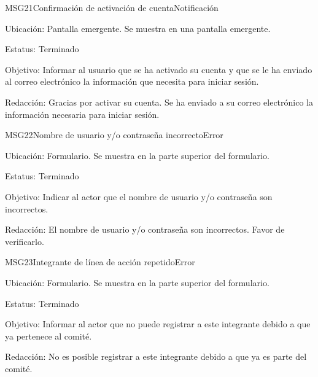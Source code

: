 \begin{mensaje}{MSG21}{Confirmación de activación de cuenta}{Notificación}
    \item[Ubicación:] Pantalla emergente. Se muestra en una pantalla emergente.
    \item[Estatus:] Terminado
    \item[Objetivo:] Informar al usuario que se ha activado su cuenta y que se le ha enviado al correo electrónico la información que necesita para iniciar sesión.
    \item[Redacción:] Gracias por activar su cuenta. Se ha enviado a su correo electrónico la información necesaria para iniciar sesión.
\end{mensaje}

\begin{mensaje}{MSG22}{Nombre de usuario y/o contraseña incorrecto}{Error}
    \item[Ubicación:] Formulario. Se muestra en la parte superior del formulario.
    \item[Estatus:] Terminado
    \item[Objetivo:] Indicar al actor que el nombre de usuario y/o contraseña son incorrectos.
    \item[Redacción:] El nombre de usuario y/o contraseña son incorrectos. Favor de verificarlo.
\end{mensaje}
\begin{mensaje}{MSG23}{Integrante de línea de acción repetido}{Error}
    \item[Ubicación:] Formulario. Se muestra en la parte superior del formulario.
    \item[Estatus:] Terminado
    \item[Objetivo:] Informar al actor que no puede registrar a este integrante debido a que ya pertenece al comité.
    \item[Redacción:] No es posible registrar a este integrante debido a que ya es parte del comité.
\end{mensaje}
